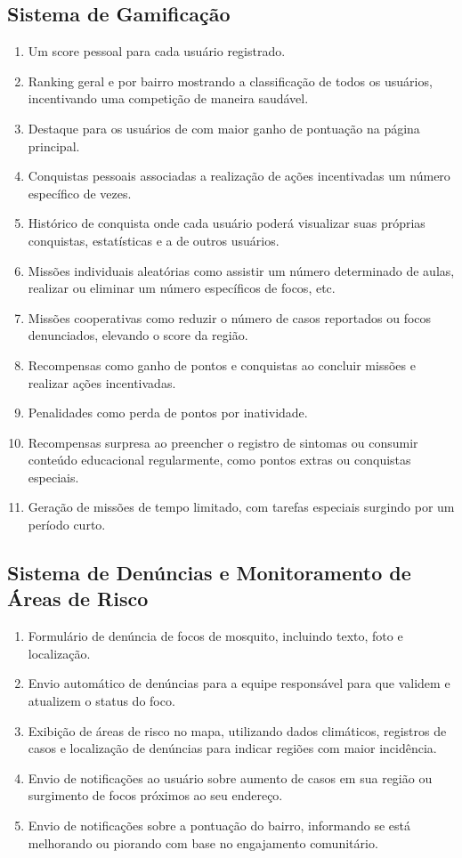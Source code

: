 \documentclass[a4paper, 12pt]{article}
\begin{document}
\subsection{Sistema de Gamificação}
\begin{enumerate}
    \item Um score pessoal para cada usuário registrado.
    \item Ranking geral e por bairro mostrando a classificação de todos os usuários, incentivando uma competição de maneira saudável.
    \item Destaque para os usuários de com maior ganho de pontuação na página principal.
    \item Conquistas pessoais associadas a realização de ações incentivadas um número específico de vezes.
    \item Histórico de conquista onde cada usuário poderá visualizar suas próprias conquistas, estatísticas e a de outros usuários.
    \item Missões individuais aleatórias como assistir um número determinado de aulas, realizar ou eliminar um número específicos de focos, etc.
    \item Missões cooperativas como reduzir o número de casos reportados ou focos denunciados, elevando o score da região.
    \item Recompensas como ganho de pontos e conquistas ao concluir missões e realizar ações incentivadas.
    \item Penalidades como perda de pontos por inatividade.
    \item Recompensas surpresa ao preencher o registro de sintomas ou consumir conteúdo educacional regularmente, como pontos extras ou conquistas especiais.
    \item Geração de missões de tempo limitado, com tarefas especiais surgindo por um período curto.
\end{enumerate}

\subsection{Sistema de Denúncias e Monitoramento de Áreas de Risco}
\begin{enumerate}
    \item Formulário de denúncia de focos de mosquito, incluindo texto, foto e localização.
    \item Envio automático de denúncias para a equipe responsável para que validem e atualizem o status do foco. 
    \item Exibição de áreas de risco no mapa, utilizando dados climáticos, registros de casos e localização de denúncias para indicar regiões com maior incidência.
    \item Envio de notificações ao usuário sobre aumento de casos em sua região ou surgimento de focos próximos ao seu endereço.
    \item Envio de notificações sobre a pontuação do bairro, informando se está melhorando ou piorando com base no engajamento comunitário.
\end{enumerate}
\end{document}
